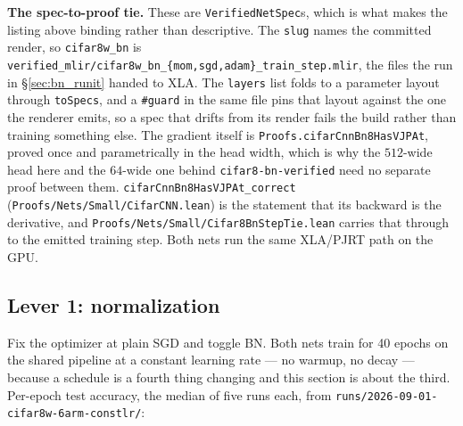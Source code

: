 \medskip\noindent\textbf{The spec-to-proof tie.} These are
\texttt{VerifiedNetSpec}s, which is what makes the listing above
binding rather than descriptive. The \texttt{slug} names the committed
render, so \texttt{cifar8w\_bn} is
\texttt{verified\_mlir/cifar8w\_bn\_\{mom,sgd,adam\}\_train\_step.mlir},
the files the run in \S\ref{sec:bn_runit} handed to XLA. The
\texttt{layers} list folds to a parameter layout through
\texttt{toSpecs}, and a \texttt{\#guard} in the same file pins that
layout against the one the renderer emits, so a spec that drifts from
its render fails the build rather than training something else. The
gradient itself is \texttt{Proofs.cifarCnnBn8HasVJPAt}, proved once
and parametrically in the head width, which is why the
$512$-wide head here and the $64$-wide one behind \texttt{cifar8-bn-verified}
need no separate proof between them. \texttt{cifarCnnBn8HasVJPAt\_correct}
(\texttt{Proofs/Nets/Small/CifarCNN.lean}) is the statement that its
backward is the derivative, and \texttt{Proofs/Nets/Small/Cifar8BnStepTie.lean} carries
that through to the emitted training step. Both nets run the same
XLA/PJRT path on the GPU.

\subsection*{Lever 1: normalization}

Fix the optimizer at plain SGD and toggle BN. Both nets train for 40
epochs on the shared pipeline at a constant learning rate --- no
warmup, no decay --- because a schedule is a fourth thing changing and
this section is about the third. Per-epoch test accuracy, the median of
five runs each, from \texttt{runs/2026-09-01-cifar8w-6arm-constlr/}:


